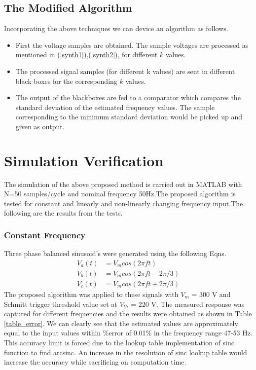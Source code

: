 \subsection{The Modified Algorithm}
Incorporating the above techniques we can device an algorithm as follows.
\begin{itemize}
\item First the voltage samples are obtained. The sample voltages are processed as mentioned in (\ref{synth1}),(\ref{synth2}), for different $k$ values.
\item The processed signal samples (for different k values) are sent in different black boxes for the corresponding $k$ values.
\item The output of the blackboxes are fed to a comparator which compares the standard deviation of the estimated frequency values. The sample corresponding to the minimum standard deviation would be picked up and given as output.
\end{itemize}

\section{Simulation Verification}
The simulation of the above proposed method is carried out in MATLAB with N=50 samples/cycle and nominal frequency 50Hz.The proposed algorithm is tested for constant and linearly and non-linearly changing frequency input.The following are the results from the tests.
\subsubsection{Constant Frequency}
Three phase balanced sinusoid's were generated using the following Eqns.
\begin{align}
V_a (t) &= V_m cos(2\pi ft )\nonumber\\
V_b (t) &= V_m cos(2\pi ft - 2\pi/3 )\nonumber\\
V_c (t) &= V_m cos(2\pi ft + 2\pi/3 )
\label{3eqns}
\end{align}
The proposed algorithm was applied to these signals with $V_m$ = 300 V  and Schmitt trigger threshold value set at $V_{th}$ = 220 V. The measured response was captured for different frequencies and the results were obtained as shown in Table \ref{table_error}. We can clearly see that the estimated values are approximately equal to the input values within \%error of 0.01\% in the frequency range 47-53 Hz. This accuracy limit is forced due to the lookup table implementation of sinc function to find arcsinc. An increase in the resolution of sinc lookup table would increase the accuracy while sacrificing on computation time.

